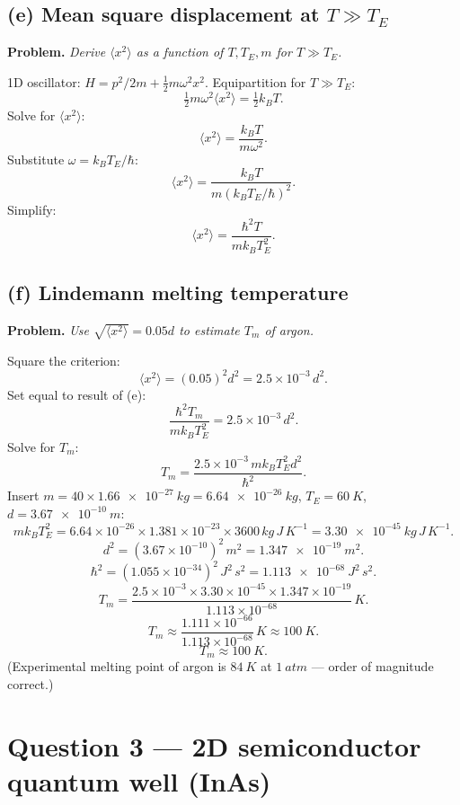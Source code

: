 \documentclass[11pt]{article}
\begin{document}
\subsection*{(e) Mean square displacement at $T\gg T_E$}

\textbf{Problem.} \emph{Derive $\langle x^2\rangle$ as a function of $T,T_E,m$ for $T\gg T_E$.}

1D oscillator: $H = p^2/2m + \tfrac12 m\omega^2 x^2$. Equipartition for $T\gg T_E$:
\[
\tfrac12 m\omega^2\langle x^2\rangle = \tfrac12 k_B T.
\]
Solve for $\langle x^2\rangle$:
\[
\langle x^2\rangle = \frac{k_B T}{m\omega^2}.
\]
Substitute $\omega = k_B T_E/\hbar$:
\[
\langle x^2\rangle = \frac{k_B T}{m (k_B T_E/\hbar)^2}.
\]
Simplify:
\[
\boxed{\;\langle x^2\rangle = \frac{\hbar^2 T}{m k_B T_E^2}.\;}
\]

\subsection*{(f) Lindemann melting temperature}

\textbf{Problem.} \emph{Use $\sqrt{\langle x^2\rangle}=0.05 d$ to estimate $T_m$ of argon.}

Square the criterion:
\[
\langle x^2\rangle = (0.05)^2 d^2 = 2.5\times 10^{-3}\, d^2.
\]
Set equal to result of (e):
\[
\frac{\hbar^2 T_m}{m k_B T_E^2} = 2.5\times 10^{-3}\, d^2.
\]
Solve for $T_m$:
\[
T_m = \frac{2.5\times 10^{-3}\, m k_B T_E^2 d^2}{\hbar^2}.
\]
Insert $m = 40\times \SI{1.66e-27}{kg} = \SI{6.64e-26}{kg}$, $T_E=\SI{60}{K}$, $d=\SI{3.67e-10}{m}$:
\[
m k_B T_E^2 = 6.64\times 10^{-26}\times 1.381\times 10^{-23}\times 3600\,\si{kg\,J\,K^{-1}} = \SI{3.30e-45}{kg\,J\,K^{-1}}.
\]
\[
d^2 = (3.67\times 10^{-10})^2\,\si{m^2} = \SI{1.347e-19}{m^2}.
\]
\[
\hbar^2 = (1.055\times 10^{-34})^2\,\si{J^2\,s^2} = \SI{1.113e-68}{J^2\,s^2}.
\]
\[
T_m = \frac{2.5\times 10^{-3}\times 3.30\times 10^{-45}\times 1.347\times 10^{-19}}{1.113\times 10^{-68}}\,\si{K}.
\]
\[
T_m \approx \frac{1.111\times 10^{-66}}{1.113\times 10^{-68}}\,\si{K} \approx \SI{100}{K}.
\]
\[
\boxed{\;T_m \approx \SI{100}{K}.\;}
\]
(Experimental melting point of argon is $\SI{84}{K}$ at $\SI{1}{atm}$ --- order of magnitude correct.)

\section*{Question 3 --- 2D semiconductor quantum well (InAs)}
\end{document}
